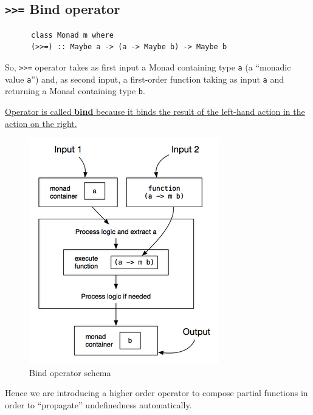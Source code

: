 
\newpage
\subsection{\texttt{>>=} Bind operator}

\begin{paracol}{2}
   \colfill
   \begin{lstlisting}
      class Monad m where
      (>>=) :: Maybe a -> (a -> Maybe b) -> Maybe b
   \end{lstlisting}
   
   So, \lstinline|>>=| operator takes as first input a Monad containing type \lstinline|a| (a ``monadic value \lstinline|a|'') and, as second input, a first-order function taking as input \lstinline|a| and returning a Monad containing type \lstinline|b|.

   \ul{Operator is called \textbf{bind} because it binds the result
   of the left-hand action in the action on the right.}
   \colfill

   \switchcolumn
   \begin{figure}[htbp]
      \centering
      \includegraphics{images/monads_bind.png}
      \caption{Bind operator schema}
      \label{fig:monads_bind}
   \end{figure}
\end{paracol}

Hence we are introducing a higher order operator to
compose partial functions in order to
``propagate'' undefinedness automatically.

